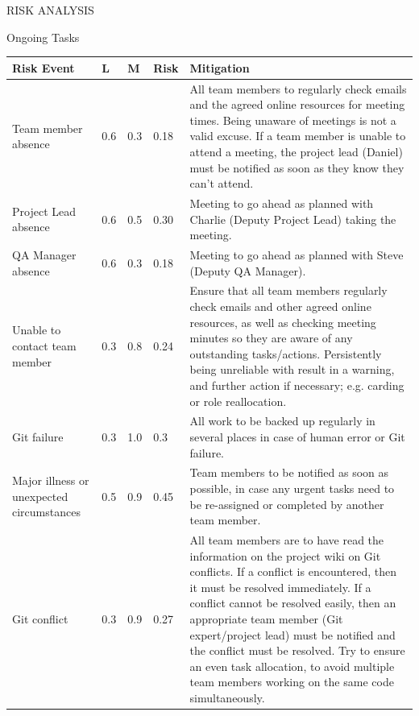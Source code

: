\documentclass{article}
\begin{document}
	\newpage
	\begin{section}{RISK ANALYSIS}
		\begin{subsection}{Ongoing Tasks}
			\begin{tabularx}{\linewidth}{| p{3.5cm} | p{0.5cm} | p{0.5cm} | p{0.8cm} | X |}
				\hline
				\bf{Risk Event} & \bf{L} & \bf{M} & \bf{Risk} & \bf{Mitigation} \\
				\hline
				Team member absence & 0.6 & 0.3 & \cellcolor{green} 0.18 & All team members to regularly check emails and the agreed online resources for meeting times. Being unaware of meetings is not a valid excuse. If a team member is unable to attend a meeting, the project lead (Daniel) must be notified as soon as they know they can't attend. \\
				\hline
				Project Lead absence & 0.6 & 0.5 & \cellcolor{negligible} 0.30 & Meeting to go ahead as planned with Charlie (Deputy Project Lead) taking the meeting. \\
				\hline
				QA Manager absence & 0.6 & 0.3 & \cellcolor{green} 0.18 & Meeting to go ahead as planned with Steve (Deputy QA Manager). \\
				\hline
				Unable to contact team member & 0.3 & 0.8 & \cellcolor{negligible} 0.24 & Ensure that all team members regularly check emails and other agreed online resources, as well as checking meeting minutes so they are aware of any outstanding tasks/actions. Persistently being unreliable with result in a warning, and further action if necessary; e.g. carding or role reallocation. \\
				\hline
				Git failure & 0.3 & 1.0 & \cellcolor{negligible} 0.3 & All work to be backed up regularly in several places in case of human error or Git failure. \\
				\hline
				Major illness or unexpected circumstances & 0.5 & 0.9 & \cellcolor{acute} 0.45 & Team members to be notified as soon as possible, in case any urgent tasks need to be re-assigned or completed by another team member. \\
				\hline
				Git conflict & 0.3 & 0.9 & \cellcolor{negligible} 0.27 & All team members are to have read the information on the project wiki on Git conflicts. If a conflict is encountered, then it must be resolved immediately. If a conflict cannot be resolved easily, then an appropriate team member (Git expert/project lead) must be notified and the conflict must be resolved. Try to ensure an even task allocation, to avoid multiple team members working on the same code simultaneously. \\

\end{tabularx}
\end{subsection}
\end{section}
\end{document}

